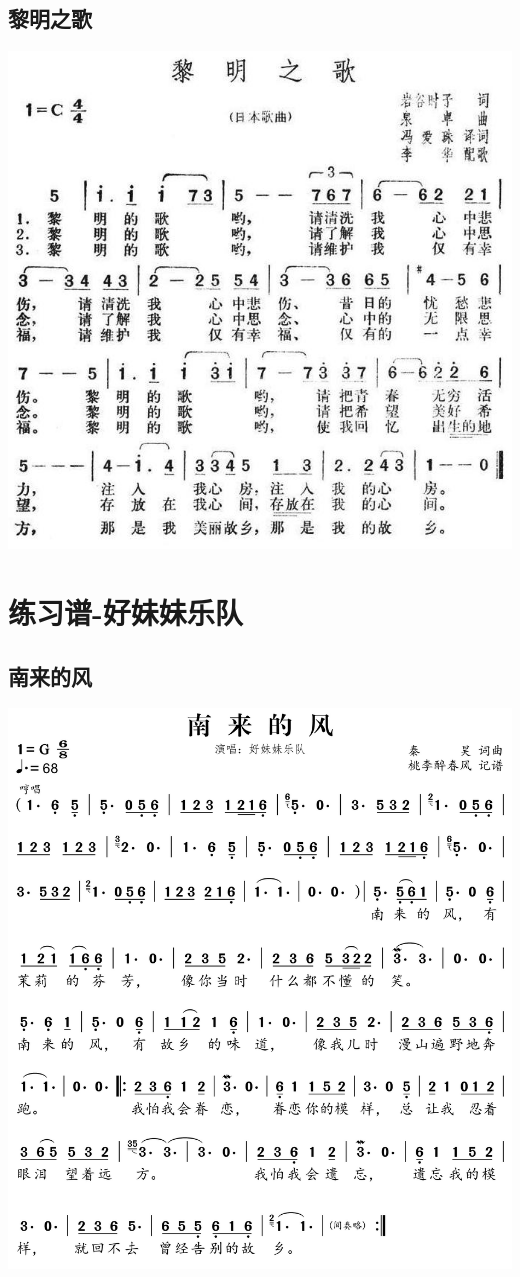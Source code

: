 \documentclass[cn,pad,chinesefont=nofont,twocol]{elegantbook}
\begin{document}
\section{黎明之歌}
	\includegraphics[width=\textwidth]{dongxiao/20200628-日本-黎明之歌}  
	
\chapter{练习谱-好妹妹乐队}
\section{南来的风}
    \includegraphics[width=\textwidth]{dongxiao/20200516-好妹妹-南来的风.jpg} 
\end{document}
